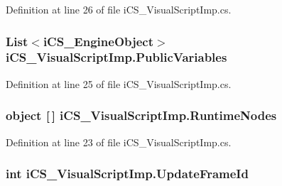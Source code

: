 Definition at line 26 of file i\+C\+S\+\_\+\+Visual\+Script\+Imp.\+cs.

\hypertarget{classi_c_s___visual_script_imp_a9a7b7f09a25bfb7f4fae04eb584e9311}{
\subsubsection[{Public\+Variables}]{\setlength{\rightskip}{0pt plus 5cm}List$<${\bf i\+C\+S\+\_\+\+Engine\+Object}$>$ i\+C\+S\+\_\+\+Visual\+Script\+Imp.\+Public\+Variables\hspace{0.3cm}{\ttfamily [get]}}}\label{classi_c_s___visual_script_imp_a9a7b7f09a25bfb7f4fae04eb584e9311}


Definition at line 25 of file i\+C\+S\+\_\+\+Visual\+Script\+Imp.\+cs.

\hypertarget{classi_c_s___visual_script_imp_a6680b94de835fdda4782e9f90ad18d29}{
\subsubsection[{Runtime\+Nodes}]{\setlength{\rightskip}{0pt plus 5cm}object \mbox{[}$\,$\mbox{]} i\+C\+S\+\_\+\+Visual\+Script\+Imp.\+Runtime\+Nodes\hspace{0.3cm}{\ttfamily [get]}}}\label{classi_c_s___visual_script_imp_a6680b94de835fdda4782e9f90ad18d29}


Definition at line 23 of file i\+C\+S\+\_\+\+Visual\+Script\+Imp.\+cs.

\hypertarget{classi_c_s___visual_script_imp_ac147c22b35c789347db9f446cf432783}{
\subsubsection[{Update\+Frame\+Id}]{\setlength{\rightskip}{0pt plus 5cm}int i\+C\+S\+\_\+\+Visual\+Script\+Imp.\+Update\+Frame\+Id\hspace{0.3cm}{\ttfamily [get]}}}\label{classi_c_s___visual_script_imp_ac147c22b35c789347db9f446cf432783}


